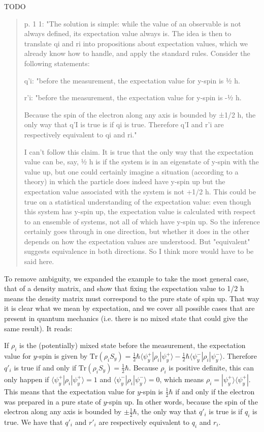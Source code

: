 \documentclass[11pt]{article}
\newcommand\change[1]{{\color{red!75!black} #1}}
\begin{document}
TODO

\begin{quote}
p. 1 1: "The solution is simple: while
the value of an observable is not always defined, its expectation value always is. The idea is
then to translate qi and ri into propositions about expectation values, which we already know
how to handle, and apply the standard rules. Consider the following statements:

q'i: "before the measurement, the expectation value for y-spin is ½ h.

r'i: "before the measurement, the expectation value for y-spin is -½ h.

Because the spin of the electron along any axis is bounded by ±1/2 h, the only way that q'I is
true is if qi is true. Therefore q'I and r'i are respectively equivalent to qi and ri."

I can't follow this claim. It is true that the only way that the expectation value can be, say, ½ h is if the system is in an eigenstate of y-spin with the value up, but one could certainly imagine a situation (according to a theory) in which the particle does indeed have y-spin up but the expectation value associated with the system is not +1/2 h. This could be true on a statistical understanding of the expectation value: even though this system has y-spin up, the expectation value is calculated with respect to an ensemble of systems, not all of which have y-spin up. So the inference certainly goes through in one direction, but whether it does in the other depends on how the expectation values are understood. But "equivalent" suggests equivalence in both directions. So I think more would have to be said here.
\end{quote}

To remove ambiguity, we expanded the example to take the most general case, that of a density matrix, and show that fixing the expectation value to 1/2 h means the density matrix must correspond to the pure state of spin up. That way it is clear what we mean by expectation, and we cover all possible cases that are present in quantum mechanics (i.e. there is no mixed state that could give the same result). It reads:

\change{If $\rho_i$ is the (potentially) mixed state before the measurement, the expectation value for $y$-spin is given by $\text{Tr}(\rho_i S_y) = \frac{1}{2} \hbar \langle \psi_y^+ | \rho_i | \psi_y^+ \rangle - \frac{1}{2} \hbar \langle \psi_y^- | \rho_i | \psi_y^- \rangle$. Therefore $q'_i$ is true if and only if $\text{Tr}(\rho_i S_y) = \frac{1}{2} \hbar$. Because $\rho_i$ is positive definite, this can only happen if $\langle \psi_y^+ | \rho_i | \psi_y^+ \rangle = 1$ and $\langle \psi_y^- | \rho_i | \psi_y^- \rangle = 0$, which means $\rho_i = | \psi_y^+ \rangle \langle \psi_y^+ |$. This means that the expectation value for $y$-spin is $\frac{1}{2} \hbar$ if and only if the electron was prepared in a pure state of $y$-spin up. In other words, because the spin of the electron along any axis is bounded by $\pm \frac{1}{2} \hbar$, the only way that $q'_i$ is true is if $q_i$ is true. We have that $q'_i$ and $r'_i$ are respectively equivalent to $q_i$ and $r_i$.}
\end{document}
